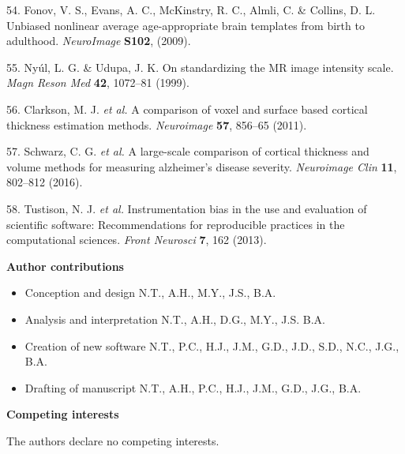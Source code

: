 \documentclass[12pt,]{article}
\begin{document}
\leavevmode\hypertarget{ref-Fonov:2009aa}{}%
54. Fonov, V. S., Evans, A. C., McKinstry, R. C., Almli, C. \& Collins,
D. L. Unbiased nonlinear average age-appropriate brain templates from
birth to adulthood. \emph{NeuroImage} \textbf{S102}, (2009).

\leavevmode\hypertarget{ref-Nyul:1999aa}{}%
55. Nyúl, L. G. \& Udupa, J. K. On standardizing the MR image intensity
scale. \emph{Magn Reson Med} \textbf{42}, 1072--81 (1999).

\leavevmode\hypertarget{ref-Clarkson:2011aa}{}%
56. Clarkson, M. J. \emph{et al.} A comparison of voxel and surface
based cortical thickness estimation methods. \emph{Neuroimage}
\textbf{57}, 856--65 (2011).

\leavevmode\hypertarget{ref-Schwarz:2016aa}{}%
57. Schwarz, C. G. \emph{et al.} A large-scale comparison of cortical
thickness and volume methods for measuring alzheimer's disease severity.
\emph{Neuroimage Clin} \textbf{11}, 802--812 (2016).

\leavevmode\hypertarget{ref-Tustison:2013aa}{}%
58. Tustison, N. J. \emph{et al.} Instrumentation bias in the use and
evaluation of scientific software: Recommendations for reproducible
practices in the computational sciences. \emph{Front Neurosci}
\textbf{7}, 162 (2013).



\clearpage

{\bf Author contributions}

\begin{itemize}
\item Conception and design N.T., A.H., M.Y., J.S., B.A.
\item Analysis and interpretation  N.T., A.H., D.G., M.Y., J.S. B.A.
\item Creation of new software N.T., P.C., H.J., J.M., G.D., J.D., S.D., N.C., J.G., B.A.
\item Drafting of manuscript N.T., A.H., P.C., H.J., J.M., G.D., J.G., B.A.
\end{itemize}

{\bf Competing interests}

The authors declare no competing interests.
\end{document}
